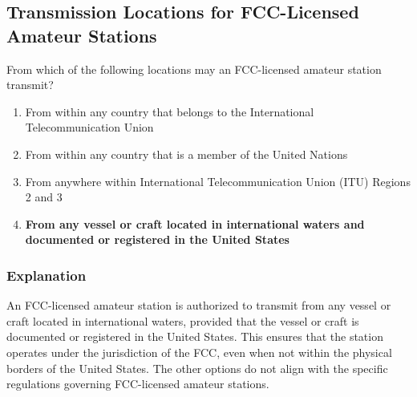 \subsection{Transmission Locations for FCC-Licensed Amateur Stations}
\label{T1C06}

\begin{tcolorbox}[colback=gray!10!white,colframe=black!75!black,title=T1C06]
From which of the following locations may an FCC-licensed amateur station transmit?
\begin{enumerate}[label=\Alph*,noitemsep]
    \item From within any country that belongs to the International Telecommunication Union
    \item From within any country that is a member of the United Nations
    \item From anywhere within International Telecommunication Union (ITU) Regions 2 and 3
    \item \textbf{From any vessel or craft located in international waters and documented or registered in the United States}
\end{enumerate}
\end{tcolorbox}

\subsubsection*{Explanation}
An FCC-licensed amateur station is authorized to transmit from any vessel or craft located in international waters, provided that the vessel or craft is documented or registered in the United States. This ensures that the station operates under the jurisdiction of the FCC, even when not within the physical borders of the United States. The other options do not align with the specific regulations governing FCC-licensed amateur stations.
